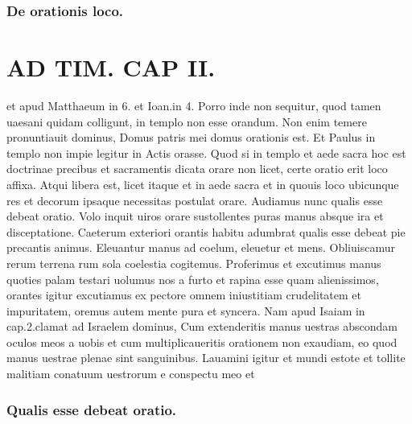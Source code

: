 \documentclass{article}
\begin{document}
\begin{pages}
\subsubsection*{De orationis loco. }
\section*{AD TIM. CAP II. }
\marginpar{[ p.118 ]}\pstart et apud Matthaeum in 6. et Ioan.in 4. Porro inde non sequitur, quod tamen uaesani quidam colligunt, in templo non esse orandum. Non enim temere pronuntiauit dominus, Domus patris mei domus orationis est. Et Paulus in templo non impie legitur in Actis orasse. Quod si in templo et aede sacra hoc est doctrinae precibus et sacramentis dicata orare non licet, certe oratio erit loco affixa. Atqui libera est, licet itaque et in aede sacra et in quouis loco ubicunque res et decorum ipsaque necessitas postulat orare. Audiamus nunc qualis esse debeat oratio. Volo inquit uiros orare sustollentes puras manus absque ira et disceptatione. Caeterum exteriori orantis habitu adumbrat qualis esse debeat pie precantis animus. Eleuantur manus ad coelum, eleuetur et mens. Obliuiscamur rerum terrena rum sola coelestia cogitemus. Proferimus et excutimus manus quoties palam testari uolumus nos a furto et rapina esse quam alienissimos, orantes igitur excutiamus ex pectore omnem iniustitiam crudelitatem et impuritatem, oremus autem mente pura et syncera. Nam apud Isaiam in cap.2.clamat ad Israelem dominus, Cum extenderitis manus uestras abscondam oculos meos a uobis et cum multiplicaueritis orationem non exaudiam, eo quod manus uestrae plenae sint sanguinibus. Lauamini igitur et mundi estote et tollite malitiam conatuum uestrorum e conspectu meo et  \pend
\subsubsection*{Qualis esse debeat oratio. }

\end{pages}
\end{document}
